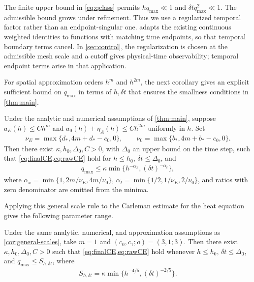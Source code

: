 \documentclass[print,wide,eng]{draft}
\begin{document}
\begin{remark}
The finite upper bound in \cref{eq:qclass} permits $hq_{\max}\ll1$ and ${\delta t}q_{\max}^2\ll1$. The admissible bound grows under refinement. Thus we use a regularized temporal factor rather than an endpoint-singular one.  adapts the existing continuous weighted identities to functions with matching time endpoints, so that temporal boundary terms cancel. In \cref{sec:control}, the regularization is chosen at the admissible mesh scale and a cutoff gives physical-time observability; temporal endpoint terms arise in that application.
\end{remark}

For spatial approximation orders $h^m$ and $h^{2m}$, the next corollary gives an explicit sufficient bound on $q_{\max}$ in terms of $h,{\delta t}$ that ensures the smallness conditions in \cref{thm:main}.

\begin{corollary}\label{cor:general-scales}
Under the analytic and numerical assumptions of \cref{thm:main}, suppose $a_E(h)\leq Ch^m$ and $a_0(h)+\eta_A(h)\leq Ch^{2m}$ uniformly in $h$. Set
\begin{align}\label{eq:budgetexponents}
\nu_E=\max\{d_*,4m+d_*-c_0,0\},\qquad
\nu_0=\max\{b_*,4m+b_*-c_0,0\}.
\end{align}
Then there exist $\kappa,h_0,\Delta_0,C>0$, with $\Delta_0$ an upper bound on the time step, such that \cref{eq:finalCE,eq:rawCE} hold for $h\leq h_0$, ${\delta t}\leq \Delta_0$, and
\begin{align}\label{eq:scalerule}
q_{\max}\leq\kappa\min\{h^{-\alpha_x},{(\delta t)}^{-\alpha_t}\},
\end{align}
where
$\alpha_x=\min\{1,2m/\nu_E,4m/\nu_0\}$,
$\alpha_t=\min\{1/2,1/\nu_E,2/\nu_0\}$,
and ratios with zero denominator are omitted from the minima.
\end{corollary}

Applying this general scale rule to the Carleman estimate for the heat equation gives the following parameter range.

\begin{corollary}\label{cor:scales}
Under the same analytic, numerical, and approximation assumptions as \cref{cor:general-scales}, take $m=1$ and $(c_0,c_1;o)=(3,1;3)$.
Then there exist $\kappa,h_0,\Delta_0,C>0$ such that \cref{eq:finalCE,eq:rawCE} hold whenever $h\leq h_0$, ${\delta t}\leq \Delta_0$, and $q_{\max}\leq S_{h,{\delta t}}$, where
\begin{align}\label{eq:mainS}
S_{h,{\delta t}}=\kappa\min\{h^{-4/5},{(\delta t)}^{-2/5}\}.
\end{align}
\end{corollary}
\end{document}
